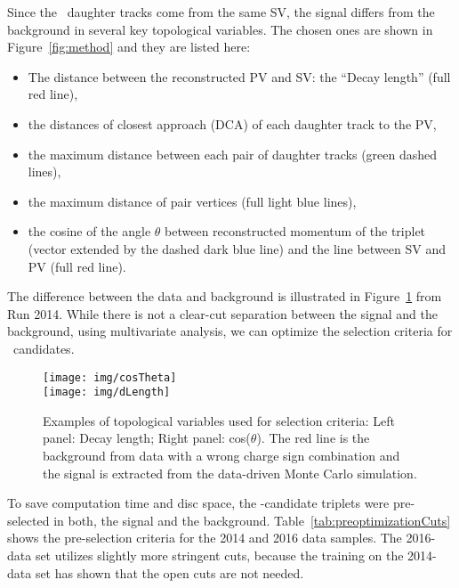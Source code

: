 Since the \Lambdac\ daughter tracks come from the same SV, the signal differs from the background in several key topological variables. The chosen ones are shown in Figure~\ref{fig:method} and they are listed here:
\begin{itemize}
 \item The distance between the reconstructed PV and SV\@: the ``Decay length'' (full red line),
 \item the distances of closest approach (DCA) of each daughter track to the PV,
 \item the maximum distance between each pair of daughter tracks (green dashed lines),
 \item the maximum distance of pair vertices (full light blue lines),
 \item the cosine of the angle $\theta$ between reconstructed momentum of the triplet (vector extended by the dashed dark blue line) and the line between SV and PV (full red line).
\end{itemize}
The difference between the data and background is illustrated in Figure~\ref{fig:optimization} from Run 2014\@. While there is not a clear-cut separation between the signal and the background, using multivariate analysis, we can optimize the selection criteria for \Lambdac\ candidates.

\begin{figure}[!htb]
\centering
\texttt{[image: img/cosTheta]}\\[1cm]
\texttt{[image: img/dLength]}
\caption{\label{fig:optimization}Examples of topological variables used for selection criteria: Left panel: Decay length; Right panel: cos($\theta$)\@. The red line is the background from data with a wrong charge sign combination and the signal is extracted from the data-driven Monte Carlo simulation.}

\end{figure}

To save computation time and disc space, the \Lambdac-candidate triplets were pre-selected in both, the signal and the background. Table~\ref{tab:preoptimizationCuts} shows the pre-selection criteria for the 2014 and 2016 data samples. The 2016-data set utilizes slightly more stringent cuts, because the training on the 2014-data set has shown that the open cuts are not needed.

